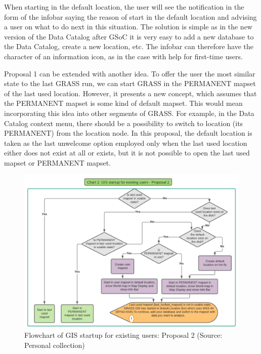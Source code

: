 \documentclass[a4paper,10pt,twoside]{article}
\begin{document}
When starting in the default location, the user will see the
notification in the form of the infobar saying the reason of start in
the default location and advising a user on what to do next in this
situation. The solution is simple as in the new version of the Data
Catalog after GSoC it is very easy to add a new database to the Data
Catalog, create a new location, etc. The infobar can therefore have
the character of an information icon, as in the case with help for
first-time users.

\newpage
\noindent Proposal 1 can be extended with another idea. To offer the user the
most similar state to the last GRASS run, we can start GRASS in the
PERMANENT mapset of the last used location. However, it presents a new
concept, which assumes that the PERMANENT mapset is some kind of
default mapset. This would mean incorporating this idea into other
segments of GRASS. For example, in the Data Catalog context menu,
there should be a possibility to switch to location (its PERMANENT)
from the location node. In this proposal, the default location is
taken as the last unwelcome option employed only when the last used
location either does not exist at all or exists, but it is not
possible to open the last used mapset or PERMANENT mapset.
 
\vspace{0.3cm}
\begin{figure}[hbt!] 
\begin{center}
\includegraphics[width=17cm]{../pictures/normal_user_diagram2.png} 
\caption[Flowchart of GIS startup for existing users: Proposal 2]{Flowchart of GIS startup for existing users: Proposal 2 (Source: Personal collection)}
\label{fig:normal_user_diagram2}
\end{center}
\end{figure}
\end{document}
